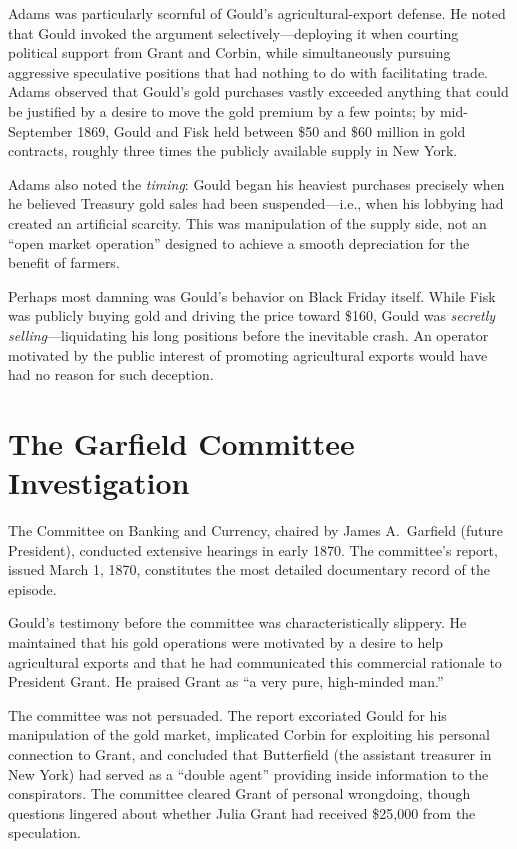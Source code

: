 \documentclass[12pt]{article}
\begin{document}
Adams was particularly scornful of Gould's agricultural-export defense. 
He noted that Gould invoked the argument selectively---deploying it when 
courting political support from Grant and Corbin, while simultaneously 
pursuing aggressive speculative positions that had nothing to do with 
facilitating trade. Adams observed that Gould's gold purchases vastly 
exceeded anything that could be justified by a desire to move the gold 
premium by a few points; by mid-September 1869, Gould and Fisk held 
between \$50 and \$60 million in gold contracts, roughly three times the 
publicly available supply in New York.

Adams also noted the \emph{timing}: Gould began his heaviest purchases 
precisely when he believed Treasury gold sales had been suspended---i.e., 
when his lobbying had created an artificial scarcity. This was 
manipulation of the supply side, not an ``open market operation'' 
designed to achieve a smooth depreciation for the benefit of farmers.

Perhaps most damning was Gould's behavior on Black Friday itself. While 
Fisk was publicly buying gold and driving the price toward \$160, Gould 
was \emph{secretly selling}---liquidating his long positions before the 
inevitable crash. An operator motivated by the public interest of 
promoting agricultural exports would have had no reason for such 
deception.

\section{The Garfield Committee Investigation}

The Committee on Banking and Currency, chaired by James A.\ Garfield 
(future President), conducted extensive hearings in early 1870. The 
committee's report, issued March 1, 1870, constitutes the most detailed 
documentary record of the episode.

Gould's testimony before the committee was characteristically slippery. 
He maintained that his gold operations were motivated by a desire to help 
agricultural exports and that he had communicated this commercial 
rationale to President Grant. He praised Grant as ``a very pure, 
high-minded man.''

The committee was not persuaded. The report excoriated Gould for his 
manipulation of the gold market, implicated Corbin for exploiting his 
personal connection to Grant, and concluded that Butterfield (the 
assistant treasurer in New York) had served as a ``double agent'' 
providing inside information to the conspirators. The committee cleared 
Grant of personal wrongdoing, though questions lingered about whether 
Julia Grant had received \$25,000 from the speculation.
\end{document}
